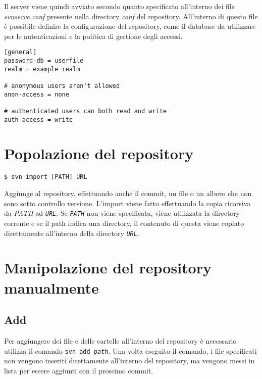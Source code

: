Il server viene quindi avviato secondo quanto specificato all'interno dei file \textit{svnserve.conf} presente nella directory \textit{conf} del repository. All'interno di questo file è possibile definire la configurazione del repository, come il database da utilizzare per le autenticazioni e la politica di gestione degli accessi.

\begin{lstlisting}
[general]
password-db = userfile
realm = example realm

# anonymous users aren't allowed
anon-access = none

# authenticated users can both read and write
auth-access = write
\end{lstlisting}

\section{Popolazione del repository}

\begin{lstlisting}
$ svn import [PATH] URL
\end{lstlisting}

Aggiunge al repository, effettuando anche il commit, un file o un albero che non sono sotto controllo versione.
L'import viene fatto effettuando la copia ricorsiva da \textit{\textit{PATH}} ad \textit{\texttt{URL}}. Se \textit{\texttt{PATH}} non viene specificata, viene utilizzata la directory corrente e se il path indica una directory, il contenuto di questa viene copiato direttamente all'interno della directory \textit{\texttt{URL}}. 


\section{Manipolazione del repository manualmente}

\subsection{Add}

Per aggiungere dei file e delle cartelle all'interno del repository è necessario utilizza il comando \texttt{svn add \textit{path}}. Una volta eseguito il comando, i file specificati non vengono inseriti direttamente all'interno del repository, ma vengono messi in lista per essere aggiunti con il prossimo commit.

